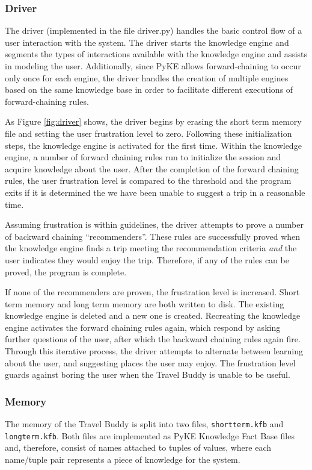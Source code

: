 \documentclass[11pt]{article} %
\begin{document}
\subsubsection{Driver}
The driver (implemented in the file driver.py) handles the
basic control flow of a user interaction with the system.
The driver starts the knowledge engine and 
segments the types of interactions available
with the knowledge engine and assists in modeling the
user. Additionally, since PyKE allows forward-chaining to
occur only once for each engine, the driver handles the
creation of multiple engines based on the same knowledge
base in order to facilitate different executions of
forward-chaining rules.

As Figure \ref{fig:driver} shows, the driver begins by erasing the short term memory file and setting the user frustration level to zero. Following these initialization steps, the knowledge engine is activated for the first time. Within the knowledge engine, a number of forward chaining rules run to initialize the session and acquire knowledge about the user. After the completion of the forward chaining rules, the user frustration level is compared to the threshold and the program exits if it is determined the we have been unable to suggest a trip in a reasonable time.

Assuming frustration is within guidelines, the driver attempts to prove a number of backward chaining ``recommenders''. These rules are successfully proved when the knowledge engine finds a trip meeting the recommendation criteria \emph{and} the user indicates they would enjoy the trip. Therefore, if any of the rules can be proved, the program is complete.

If none of the recommenders are proven, the frustration level is increased. Short term memory and long term memory are both written to disk. The existing knowledge engine is deleted and a new one is created. Recreating the knowledge engine activates the forward chaining rules again, which respond by asking further questions of the user, after which the backward chaining rules again fire. Through this iterative process, the driver attempts to alternate between learning about the user, and suggesting places the user may enjoy. The frustration level guards against boring the user when the Travel Buddy is unable to be useful.

\subsubsection{Memory}
The memory of the Travel Buddy is split into two files, \texttt{shortterm.kfb} and \texttt{longterm.kfb}. Both files are implemented as PyKE Knowledge Fact Base files and, therefore, consist of names attached to tuples of values, where each name/tuple pair represents a piece of knowledge for the system.
\end{document}
